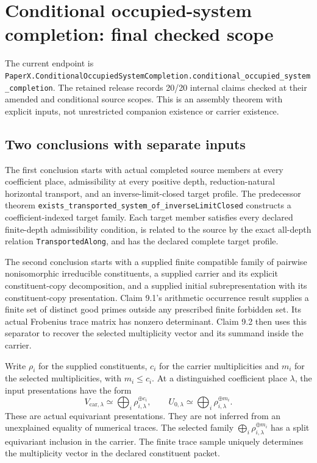 \clearpage
\section{Conditional occupied-system completion: final checked scope}
\label{sec:conditional-final}
The current endpoint is
\nolinkurl{PaperX.ConditionalOccupiedSystemCompletion.conditional_occupied_system_completion}.
The retained release records 20/20 internal claims checked at their amended and conditional source scopes. This is an assembly theorem with explicit inputs, not unrestricted companion existence or carrier existence.

\subsection{Two conclusions with separate inputs}
The first conclusion starts with actual completed source members at every coefficient place, admissibility at every positive depth, reduction-natural horizontal transport, and an inverse-limit-closed target profile. The predecessor theorem
\nolinkurl{exists_transported_system_of_inverseLimitClosed}
constructs a coefficient-indexed target family. Each target member satisfies every declared finite-depth admissibility condition, is related to the source by the exact all-depth relation \nolinkurl{TransportedAlong}, and has the declared complete target profile.

The second conclusion starts with a supplied finite compatible family of pairwise nonisomorphic irreducible constituents, a supplied carrier and its explicit constituent-copy decomposition, and a supplied initial subrepresentation with its constituent-copy presentation. Claim 9.1's arithmetic occurrence result supplies a finite set of distinct good primes outside any prescribed finite forbidden set. Its actual Frobenius trace matrix has nonzero determinant. Claim 9.2 then uses this separator to recover the selected multiplicity vector and its summand inside the carrier.

Write $\rho_i$ for the supplied constituents, $c_i$ for the carrier multiplicities and $m_i$ for the selected multiplicities, with $m_i\leq c_i$. At a distinguished coefficient place $\lambda$, the input presentations have the form
\[
 V_{\mathrm{car},\lambda}\simeq\bigoplus_i\rho_{i,\lambda}^{\oplus c_i},
 \qquad U_{0,\lambda}\simeq\bigoplus_i\rho_{i,\lambda}^{\oplus m_i}.
\]
These are actual equivariant presentations. They are not inferred from an unexplained equality of numerical traces. The selected family
$\bigoplus_i\rho_{i,\lambda}^{\oplus m_i}$
has a split equivariant inclusion in the carrier. The finite trace sample uniquely determines the multiplicity vector in the declared constituent packet.

